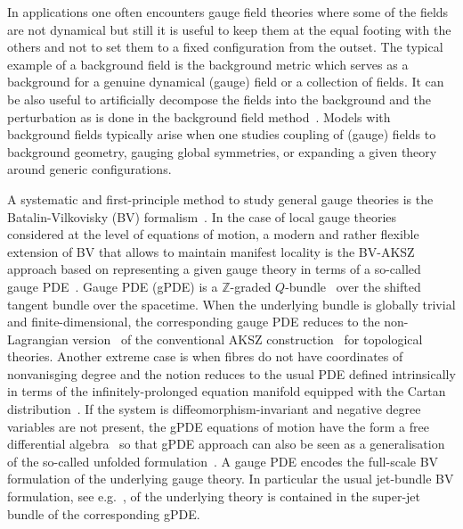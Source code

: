 \documentclass[a4paper,12pt]{article}
\numberwithin{equation}{section} %
\newcommand{\fZ}{\mathbb{Z}}
\begin{document}
In applications one often encounters gauge field theories where some of the fields are not dynamical but still it is useful to keep them at the equal footing with the others and not to set them to a fixed configuration from the outset. The typical example of a background field is the background metric which serves as a background for a genuine dynamical (gauge) field or a collection of fields. It can be also useful to artificially decompose the fields into the background and the perturbation as is done in the background field method~\cite{Abbott1982}.  Models with background fields typically arise when one studies coupling of (gauge) fields to background geometry, gauging global symmetries, or expanding a given theory around generic configurations. 

A systematic and first-principle method to study general gauge theories is the Batalin-Vilkovisky (BV) formalism~\cite{Batalin:1981jr,Batalin:1983wj}. In the case of local gauge theories considered at the level of equations of motion,  a modern and rather flexible extension of BV that allows to maintain manifest locality is the BV-AKSZ approach based on representing a given gauge theory in terms of a so-called gauge PDE~\cite{Grigoriev:2019ojp,Barnich:2010sw,Barnich:2004cr}. Gauge PDE (gPDE) is a $\fZ$-graded $Q$-bundle~\cite{Kotov:2007nr} over the shifted tangent bundle over the spacetime. When the underlying bundle is globally trivial and finite-dimensional, the corresponding gauge PDE reduces to the non-Lagrangian version~\cite{Barnich:2006hbb} of the conventional AKSZ construction~\cite{Alexandrov:1995kv} for topological theories. Another extreme case is when fibres do not have coordinates of nonvanisging degree and the notion reduces to the usual PDE defined intrinsically in terms of the infinitely-prolonged equation manifold equipped with the Cartan distribution~\cite{Vinogradov:1977,Krasil?shchik-Lychagin-Vinogradov}. 
If the system is diffeomorphism-invariant and negative degree variables are not present, the gPDE equations of motion have the form a free differential algebra~\cite{Sullivan:1977fk} so that gPDE approach can also be seen as a generalisation of the so-called unfolded formulation~\cite{Vasiliev:1980as,Lopatin:1987hz,Vasiliev:2005zu}. A gauge PDE encodes the full-scale BV formulation of the underlying gauge theory. In particular the usual jet-bundle BV formulation, see e.g.~\cite{Barnich:1995ap,Barnich:2000zw}, of the underlying theory is contained in the super-jet bundle of the corresponding gPDE.  
\end{document}
